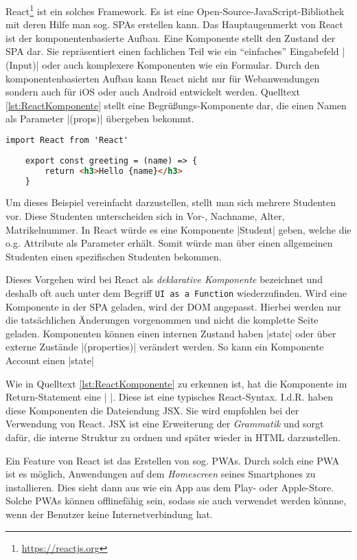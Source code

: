 React\footnote{\url{https://reactjs.org}} ist ein solches Framework. Es ist eine Open-Source-JavaScript-Bibliothek mit deren Hilfe man sog. \acfp{SPA} erstellen kann.\autocite[ ][]{hartmann2019react} 
Das Hauptaugenmerkt von React ist der komponentenbasierte Aufbau. Eine Komponente stellt den Zustand der \acs{SPA} dar. 
Sie repräsentiert einen fachlichen Teil wie \zb ein \enquote{einfaches} Eingabefeld \jinline|(Input)| oder auch komplexere Komponenten wie ein Formular.
Durch den komponentenbasierten Aufbau kann React nicht nur für Webanwendungen sondern auch für iOS oder auch Android entwickelt werden. 
Quelltext \vref{lst:ReactKomponente} stellt eine Begrüßungs-Komponente dar, die einen Namen als Parameter \jinline|(props)| übergeben bekommt. 

\begin{lstlisting}[caption={React-Komponente: Greeting},label={lst:ReactKomponente},language=HTML, showstringspaces={false}]
	import React from 'React'
	
	export const greeting = (name) => {
		return <h3>Hello {name}</h3>
	}
\end{lstlisting}

Um dieses Beispiel vereinfacht darzustellen, stellt man sich mehrere Studenten vor. 
Diese Studenten unterscheiden sich \zb in Vor-, Nachname, Alter, Matrikelnummer. 
In React würde es eine Komponente \jinline|Student| geben, welche die o.g. Attribute als Parameter erhält. 
Somit würde man über einen allgemeinen Studenten einen spezifischen Studenten bekommen. 

Dieses Vorgehen wird bei React als \emph{deklarative Komponente} bezeichnet und deshalb oft auch unter dem Begriff \texttt{UI as a Function} wiederzufinden. \autocite[ ][]{hartmann2019react} 
Wird eine Komponente in der \acs{SPA} geladen, wird der \acs{DOM} angepasst. 
Hierbei werden nur die tatsächlichen Änderungen vorgenommen und nicht die komplette Seite geladen. \newline
Komponenten können einen internen Zustand haben \jinline|state| oder über externe Zustände \jinline|(properties)| verändert werden. So kann \zb ein Komponente Account einen \jinline|state| 

Wie in Quelltext \vref{lst:ReactKomponente} zu erkennen ist, hat die Komponente im Return-Statement eine \jinline|{ }|. 
Diese ist eine typisches React-Syntax. 
I.d.R. haben diese Komponenten die Dateiendung \acf{JSX}. 
Sie wird empfohlen bei der Verwendung von React. 
\acs{JSX} ist eine Erweiterung der \emph{Grammatik} und sorgt dafür, die interne Struktur zu ordnen und später wieder in \acs{HTML} darzustellen.\autocite[ ][]{WasIstJSX} 

Ein Feature von React ist das Erstellen von sog. \acfp{PWA}. 
Durch solch eine \acs{PWA} ist es möglich, Anwendungen auf dem \emph{Homescreen} seines Smartphones zu installieren. 
Dies sieht dann aus wie ein App aus dem Play- oder Apple-Store. 
Solche \acsp*{PWA} können offlinefähig sein, sodass sie auch verwendet werden könnne, wenn der Benutzer keine Internetverbindung hat. \autocite[ ][]{hartmann2019react} 

